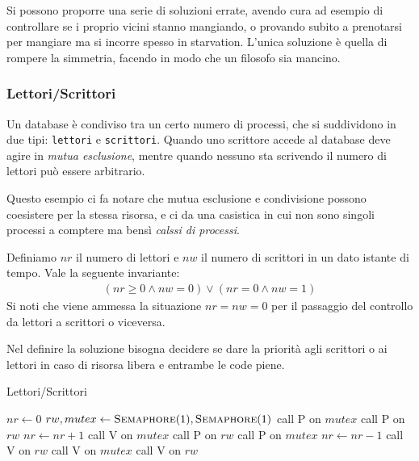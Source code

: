 \documentclass{article}
\begin{document}
Si possono proporre una serie di soluzioni errate, avendo cura ad esempio di
controllare se i proprio vicini stanno mangiando, o provando subito a
prenotarsi per mangiare ma si incorre spesso in starvation. L'unica soluzione
\`e quella di rompere la simmetria, facendo in modo che un filosofo sia mancino.


\subsubsection{Lettori/Scrittori}
\label{rw}

Un database \`e condiviso tra un certo numero di processi, che si suddividono
in due tipi: \texttt{lettori} e \texttt{scrittori}. Quando uno scrittore accede
al database deve agire in \emph{mutua esclusione}, mentre quando nessuno sta
scrivendo il numero di lettori pu\`o essere arbitrario.

Questo esempio ci fa notare che mutua esclusione e condivisione possono
coesistere per la stessa risorsa, e ci da una casistica in cui non sono singoli
processi a comptere ma bens\`i \emph{calssi di processi}.

Definiamo $nr$ il numero di lettori e $nw$ il numero di scrittori in un dato
istante di tempo. Vale la seguente invariante:
\begin{align*}
  (nr \geq 0 \wedge nw = 0) \vee (nr = 0 \wedge nw = 1)
\end{align*}
Si noti che viene ammessa la situazione $nr = nw = 0$
per il passaggio del controllo da lettori a scrittori o viceversa.

Nel definire la soluzione bisogna decidere se dare la priorit\`a agli scrittori
o ai lettori in caso di risorsa libera e entrambe le code piene.

\begin{algorithm}[H]
  \caption{Lettori/Scrittori}
  \begin{algorithmic}[0]
    \State $nr \gets 0$
    \State $rw, mutex \gets \textsc{Semaphore}(1), \textsc{Semaphore}(1)$
    \State
      \State call \textsc{P} on $mutex$
        \State call \textsc{P} on $rw$
      \EndIf
      \State $nr \gets nr + 1$
      \State call \textsc{V} on $mutex$
    \EndProcedure
    \State
      \State call \textsc{P} on $rw$
    \EndProcedure
    \State
      \State call \textsc{P} on $mutex$
      \State $nr \gets nr - 1$
        \State call \textsc{V} on $rw$
      \EndIf
      \State call \textsc{V} on $mutex$
    \EndProcedure
    \State
      \State call \textsc{V} on $rw$
    \EndProcedure
  \end{algorithmic}
\end{algorithm}
\end{document}
